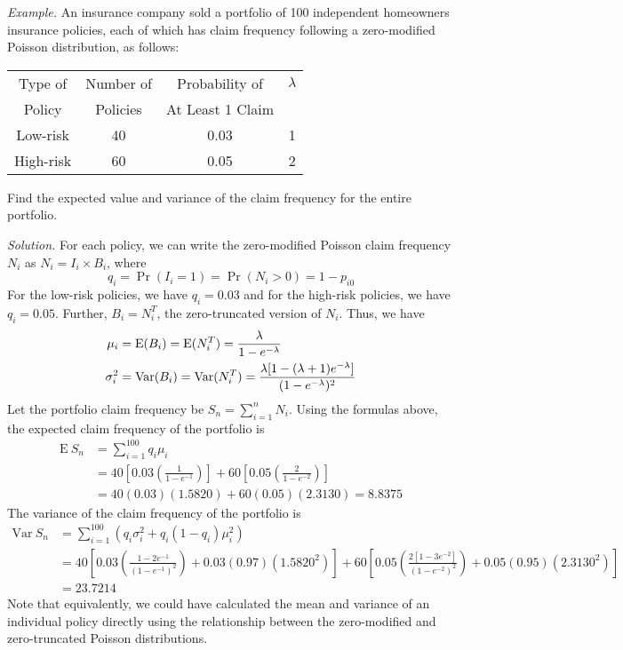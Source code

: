 \documentclass[12pt,letterpaper]{article}
\begin{document}

\noindent \textit{Example.} An insurance company sold a portfolio of 100 independent homeowners insurance policies, each of which has claim frequency following a zero-modified Poisson distribution, as follows:

\begin{center}
	\begin{tabular}{c c cc} \hline
		Type of & Number of  & Probability of & $\lambda$ \\
		Policy & Policies  &  At Least 1 Claim&  \\ \hline
		Low-risk & 40 & 0.03 & 1 \\
		High-risk & 60 & 0.05 & 2 \\ \hline
	\end{tabular}
\end{center}
Find the expected value and variance of the claim frequency for the entire portfolio.

\bigskip

\noindent \textit{Solution.}
For each policy, we can write the zero-modified Poisson claim frequency $N_i$ as $N_i = I_i \times B_i$, where
$$q_i = \Pr(I_i = 1) = \Pr(N_i > 0) = 1-p_{i0}$$
For the low-risk policies, we have $q_i = 0.03$ and for the high-risk policies, we have $q_i=0.05$. Further, $B_i = N_i^T$, the zero-truncated version of $N_i$. Thus, we have
\begin{align*}
\mu_i &={\rm E}(B_i) = {\rm E}(N_i^T) = \frac{\lambda}{1-e^{-\lambda}} \\
\sigma_i^2 &={\rm Var}(B_i) = {\rm Var}(N_i^T) = \frac{\lambda [1-(\lambda+1)e^{-\lambda}]}{(1-e^{-\lambda})^2}
\end{align*}
Let the portfolio claim frequency be $S_n = \sum_{i=1}^n N_i$. Using the formulas above, the expected claim frequency of the portfolio is
\begin{align*}
	\mathrm{E~} S_n &= \sum_{i=1}^{100} q_i \mu_i \\
	& = 40\left[0.03 \left(\frac{1}{1-e^{-1}} \right) \right] + 60 \left[0.05 \left( \frac{2}{1-e^{-2}} \right) \right] \\
	&= 40(0.03)(1.5820) + 60(0.05)(2.3130) = 8.8375
\end{align*}
The variance of the claim frequency of the portfolio is
\begin{align*}
	\mathrm{Var~}S_n &= \sum_{i=1}^{100} \left( q_i \sigma _i^2+q_i (1-q_i
	)\mu_i^2 \right) \\
	&= 40 \left[ 0.03 \left(\frac{1-2e^{-1}}{(1-e^{-1})^2} \right) + 0.03(0.97)(1.5820^2) \right] + 60 \left[0.05 \left( \frac{2[1-3e^{-2}]}{ (1-e^{-2})^2} \right) + 0.05(0.95)(2.3130^2) \right] \\
	&= 23.7214
\end{align*}
Note that equivalently, we could have calculated the mean and variance of an individual policy directly using the relationship between the zero-modified and zero-truncated Poisson distributions.
\end{document}
